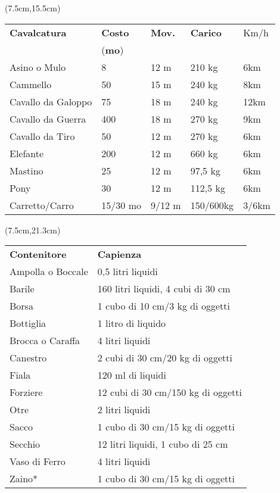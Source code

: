 \documentclass[a4paper,12 pt,openany]{book}
\begin{document}
	\begin{textblock*}{12.5cm}(7.5cm,15.5cm) %

\begin{tabular}{lllll}
\hline
	\textbf{Cavalcatura}&\textbf{Costo}&\textbf{Mov.}&\textbf{Carico}&Km/h\\
	&(\textbf{mo})&&&\\
	Asino o Mulo&8&12 m&210 kg&6km\\
	Cammello&50&15 m&240 kg&8km\\
	Cavallo da Galoppo&75&18 m&240 kg&12km\\
	Cavallo da Guerra&400&18 m&270 kg&9km\\
	Cavallo da Tiro&50&12 m&270 kg&6km\\
	Elefante&200&12 m&660 kg&6km\\
	Mastino&25&12 m&97,5 kg&6km\\
	Pony&30&12 m&112,5 kg&6km\\
	Carretto/Carro    & 15/30 mo & 9/12 m   &150/600kg    & 3/6km              \\
\end{tabular}

\end{textblock*}

	\begin{textblock*}{12.5cm}(7.5cm,21.3cm) %

\begin{tabular}{ll}

	\textbf{Contenitore}&\textbf{Capienza}\\
	Ampolla o Boccale&0,5 litri liquidi\\
	Barile&			160 litri liquidi, 4 cubi di 30 cm\\
	Borsa&			1 cubo di 10 cm/3 kg di oggetti\\
	Bottiglia&		1 litro di liquido\\
	Brocca o Caraffa&4 litri liquidi\\
	Canestro&		2 cubi di 30 cm/20 kg di oggetti\\
	Fiala&			120 ml di liquidi\\
	Forziere&		12 cubi di 30 cm/150 kg di oggetti\\
	Otre&			2 litri liquidi\\
	Sacco&			1 cubo di 30 cm/15 kg di oggetti\\
	Secchio&		12 litri liquidi, 1 cubo di 25 cm\\
	Vaso di Ferro&	4 litri liquidi\\
	Zaino*&			1 cubo di 30 cm/15 kg di oggetti\\
\end{tabular}
\end{textblock*}
\end{document}
